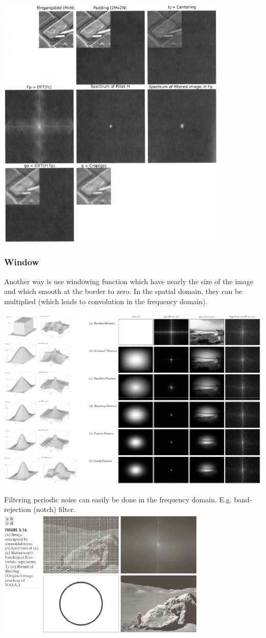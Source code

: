 \begin{minipage}{11cm}
  \includegraphics[width=11cm]{./images/frequency_filtering_padding.jpg}
\end{minipage}

\clearpage
\subsubsection{Window}
Another way is use windowing function which have nearly the size of the image and which smooth at 
the border to zero. In the spatial domain, they can be multiplied (which leads to convolution in 
the frequency domain).

\includegraphics[width=\linewidth]{./images/window_functions.png}

Filtering periodic noise can easily be done in the frequency domain.
E.g. band-rejection (notch) filter.\\
\includegraphics[width=10cm]{./images/periodic_noise_filter.png}